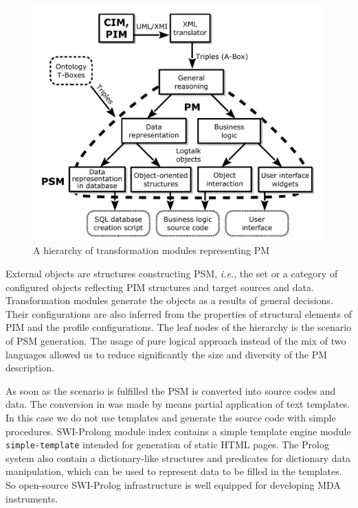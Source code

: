 \documentclass[runningheads]{llncs}
\begin{document}
\begin{figure}[t]
  \centering
  \includegraphics[width=1\linewidth]{architect_tree_pres-en-wo-OCL.pdf}
  \caption{A hierarchy of transformation modules representing PM}
  \label{fig:modules}
\end{figure}

External objects are structures constructing PSM, \emph{i.e.}, the set or a category of configured objects reflecting PIM structures and target sources and data.  Transformation modules generate the objects as a results of general decisions.  Their configurations are also inferred from the properties of structural elements of PIM and the profile configurations.  The leaf nodes of the hierarchy is the scenario of PSM generation.  The usage of pure logical approach instead of the mix of two languages allowed us to reduce significantly the size and diversity of the PM description.

As soon as the scenario is fulfilled the PSM is converted into source codes and data.  The conversion in \cite{tereh1} was made by means partial application of text templates.  In this case we do not use templates and generate the source code with simple procedures.  SWI-Prolong module index contains a simple template engine module \texttt{simple-template} intended for generation of static HTML pages.  The Prolog system also contain a dictionary-like structures and predicates for dictionary data manipulation, which can be used to represent data to be filled in the templates.  So open-source SWI-Prolog infrastructure is well equipped for developing MDA instruments.
\end{document}
